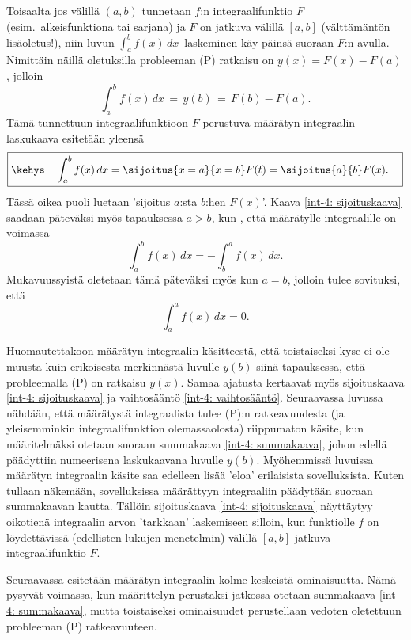 Toisaalta jos välillä $(a,b)$ tunnetaan $f$:n integraalifunktio $F$ 
(esim.\ alkeisfunktiona tai sarjana) ja $F$ on jatkuva välillä $[a,b]$
(välttämäntön lisäoletus!), niin luvun $\int_a^b f(x)\,dx\,$ laskeminen käy päinsä suoraan
$F$:n avulla. Nimittäin näillä oletuksilla probleeman (P) ratkaisu on $y(x)=F(x)-F(a)$,
jolloin
\[
\int_a^b f(x)\, dx \,=\, y(b) \,=\,F(b)-F(a).
\]
Tämä tunnettuun integraalifunktioon $F$ perustuva määrätyn integraalin laskukaava esitetään
yleensä  
\begin{equation} \label{int-4: sijoituskaava}
\boxed{\kehys\quad \int_a^b f(x)\,dx = \sijoitus{x=a}{x=b} F(t) 
                                     = \sijoitus{a}{b} F(x). \quad}
\end{equation}
Tässä oikea puoli luetaan 'sijoitus $a$:sta $b$:hen $F(x)$'. Kaava \eqref{int-4: sijoituskaava}
saadaan päteväksi myös tapauksessa $a>b$, kun , että määrätylle integraalille
on voimassa  
\begin{equation} \label{int-4: vaihtosääntö}
\boxed{\quad \int_{a}^b f(x)\, dx=-\int_{b}^a f(x)\, dx. \quad}
\end{equation}
Mukavuussyistä oletetaan tämä päteväksi myös kun $a=b$, jolloin tulee sovituksi, että
\[
\int_a^a f(x)\, dx=0.
\]

Huomautettakoon määrätyn integraalin käsitteestä, että toistaiseksi kyse ei ole muusta kuin
erikoisesta merkinnästä luvulle $y(b)$ siinä tapauksessa, että probleemalla (P) on ratkaisu
$y(x)$. Samaa ajatusta kertaavat myös sijoituskaava \eqref{int-4: sijoituskaava} ja
vaihtosääntö \eqref{int-4: vaihtosääntö}. Seuraavassa luvussa nähdään, että
määrätystä integraalista tulee (P):n ratkeavuudesta (ja yleisemminkin integraalifunktion
olemassaolosta) riippumaton käsite, kun määritelmäksi otetaan suoraan summakaava
\eqref{int-4: summakaava}, johon edellä päädyttiin numeerisena laskukaavana luvulle $y(b)$.
Myöhemmissä luvuissa määrätyn integraalin käsite saa edelleen lisää 'eloa' erilaisista
sovelluksista. Kuten tullaan näkemään, sovelluksissa määrättyyn integraaliin päädytään
suoraan summakaavan kautta. Tällöin sijoituskaava \eqref{int-4: sijoituskaava} näyttäytyy
oikotienä integraalin arvon 'tarkkaan' laskemiseen silloin, kun funktiolle $f$ on löydettävissä
(edellisten lukujen menetelmin) välillä $[a,b]$ jatkuva integraalifunktio $F$.  

Seuraavassa esitetään määrätyn integraalin kolme keskeistä ominaisuutta. Nämä pysyvät voimassa,
kun määrittelyn perustaksi jatkossa otetaan summakaava \eqref{int-4: summakaava}, mutta
toistaiseksi ominaisuudet perustellaan vedoten oletettuun probleeman (P) ratkeavuuteen. 


